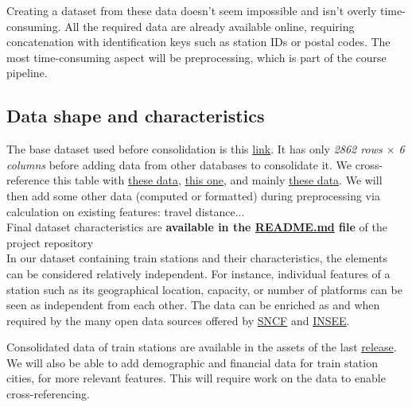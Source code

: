 \documentclass[10pt,a4paper,hidelinks]{article}
\begin{document}
Creating a dataset from these data doesn't seem impossible and isn't overly time-consuming. All the required data are already available online, requiring concatenation with identification keys such as station IDs or postal codes. The most time-consuming aspect will be preprocessing, which is part of the course pipeline.

\subsection{Data shape and characteristics}
The base dataset used before consolidation is this \href{https://ressources.data.sncf.com/explore/dataset/gares-de-voyageurs/}{link}. It has only \textit{2862 rows $\times$ 6 columns} before adding data from other databases to consolidate it. We cross-reference this table with \href{https://ressources.data.sncf.com/explore/dataset/gares-pianos/information/}{these data}, \href{https://ressources.data.sncf.com/explore/dataset/gares-equipees-du-wifi/information/}{this one}, and mainly \href{https://ressources.data.sncf.com/explore/dataset/frequentation-gares/information/}{these data}. We will then add some other data (computed or formatted) during preprocessing via calculation on existing features: travel distance...\\

Final dataset characteristics are \textbf{available in the \href{https://github.com/pierre-jezegou/fib-ml-project/blob/main/README.md}{README.md} file} of the project repository\\


In our dataset containing train stations and their characteristics, the elements can be considered relatively independent. For instance, individual features of a station such as its geographical location, capacity, or number of platforms can be seen as independent from each other. The data can be enriched as and when required by the many open data sources offered by \href{https://ressources.data.sncf.com/}{SNCF} and \href{https://statistiques-locales.insee.fr/}{INSEE}.

Consolidated data of train stations are available in the assets of the last \href{https://github.com/pierre-jezegou/fib-ml-project/releases/}{release}.\\

We will also be able to add demographic and financial data for train station cities, for more relevant features. This will require work on the data to enable cross-referencing.
\end{document}
